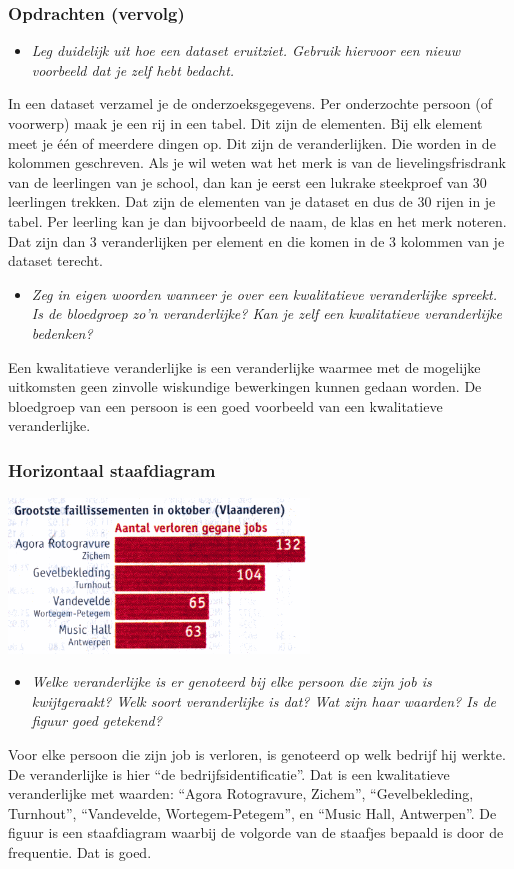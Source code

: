 \documentclass[dutch]{beamer}
\newcommand{\vraag}[1]{\begin{itemize}\item {\it #1}\end{itemize}}
\begin{document}
\begin{frame}
\frametitle{Opdrachten {\smallskip (vervolg)}}
\vraag{Leg duidelijk uit hoe een dataset eruitziet. Gebruik hiervoor een nieuw voorbeeld dat je zelf
hebt bedacht.}
\pause
In een dataset verzamel je de onderzoeksgegevens. Per onderzochte persoon (of voorwerp)
maak je een rij in een tabel. Dit zijn de elementen. Bij elk element meet je één of meerdere
dingen op. Dit zijn de veranderlijken. Die worden in de kolommen geschreven.
Als je wil weten wat het merk is van de lievelingsfrisdrank van de leerlingen van je school,
dan kan je eerst een lukrake steekproef van 30 leerlingen trekken. Dat zijn de elementen van
je dataset en dus de 30 rijen in je tabel. Per leerling kan je dan bijvoorbeeld de naam, de klas
en het merk noteren. Dat zijn dan 3 veranderlijken per element en die komen in de 3
kolommen van je dataset terecht.
\pause
\vraag{Zeg in eigen woorden wanneer je over een kwalitatieve veranderlijke spreekt. Is de bloedgroep zo’n veranderlijke? Kan je zelf een kwalitatieve veranderlijke bedenken?}
\pause
Een kwalitatieve veranderlijke is een veranderlijke waarmee met de mogelijke uitkomsten
geen zinvolle wiskundige bewerkingen kunnen gedaan worden. De bloedgroep van een
persoon is een goed voorbeeld van een kwalitatieve veranderlijke.
\end{frame}

\begin{frame}
\frametitle{Horizontaal staafdiagram}
\begin{center}
  \includegraphics[width=0.6\textwidth]{horizontaal_staafdiagram-faillissementen}
\end{center}
\vraag{Welke veranderlijke is er genoteerd bij elke persoon die zijn job is
kwijtgeraakt? Welk soort veranderlijke is dat? Wat zijn haar waarden? Is de figuur goed
getekend?}
\pause
Voor elke persoon die zijn job is verloren, is genoteerd op welk bedrijf hij werkte. De
veranderlijke is hier “de bedrijfsidentificatie”. Dat is een kwalitatieve
veranderlijke met waarden: “Agora Rotogravure, Zichem”, “Gevelbekleding, Turnhout”,
“Vandevelde, Wortegem-Petegem”, en “Music Hall, Antwerpen”. De figuur is een
staafdiagram waarbij de volgorde van de staafjes bepaald is door de frequentie. Dat is goed.
\end{frame}
\end{document}
